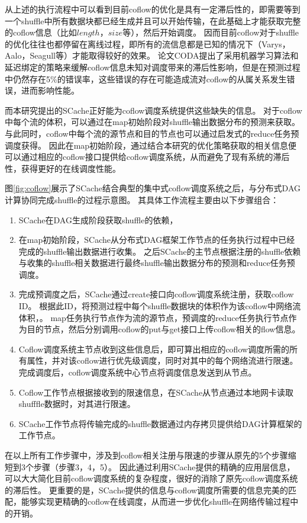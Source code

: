 从上述的执行流程中可以看到目前coflow的优化是具有一定滞后性的，即需要等到一个shuffle中所有数据块都已经生成并且可以开始传输，在此基础上才能获取完整的coflow信息（比如$length$，$size$等），然后开始调度。
因而目前coflow对于shuffle的优化往往也都停留在离线过程，即所有的流信息都是已知的情况下（Varys\cite{varys}，Aalo\cite{aalo}，Seagull\cite{seagull}等）才能取得较好的效果。
论文CODA\cite{coda}提出了采用机器学习算法和延迟绑定的策略来缓解coflow信息未知对调度带来的滞后性影响，但是在预测过程中仍然存在5\%的错误率，这些错误的存在可能造成流对coflow的从属关系发生错误，进而影响性能。

而本研究提出的SCache正好能为coflow调度系统提供这些缺失的信息。
对于coflow中每个流的体积，可以通过在map初始阶段对shuffle输出数据分布的预测来获取。
与此同时，coflow中每个流的源节点和目的节点也可以通过启发式的reduce任务预调度获得。
因此在map初始阶段，通过结合本研究的优化策略获取的相关信息便可以通过相应的coflow接口提供给coflow调度系统，从而避免了现有系统的滞后性，获得更好的在线调度性能。

图\ref{fig:coflow}展示了SCache结合典型的集中式coflow调度系统之后，与分布式DAG计算协同完成shuffle的过程示意图。
其具体工作流程主要由以下步骤组合：

\begin{enumerate}
	\item SCache在DAG生成阶段获取shuffle的依赖，
	\item 在map初始阶段，SCache从分布式DAG框架工作节点的任务执行过程中已经完成的shuffle输出数据进行收集。
	之后SCache的主节点根据注册的shuffle依赖与收集的shuffle相关数据进行最终shuffle输出数据分布的预测和reduce任务预调度。
	\item 完成预调度之后，SCache通过create接口向coflow调度系统注册，获取coflow ID。
	根据此ID，将预测过程中每个shuffle数据块的体积作为该coflow中网络流体积，。
	map任务执行节点作为流的源节点，预调度的reduce任务执行节点作为目的节点，然后分别调用coflow的put与get接口上传coflow相关的flow信息。
	\item Coflow调度系统主节点收到这些信息后，即可算出相应的coflow调度所需的所有属性，并对该coflow进行优先级调度，同时对其中的每个网络流进行限速。完成调度后，coflow调度系统中心节点将调度信息发送到从节点。
	\item Coflow工作节点根据接收到的限速信息，在SCache从节点通过本地网卡读取shufffle数据时，对其进行限速。
	\item SCache工作节点将传输完成的shuffle数据通过内存拷贝提供给DAG计算框架的工作节点。
\end{enumerate}

在以上所有工作步骤中，涉及到coflow相关注册与限速的步骤从原先的5个步骤缩短到3个步骤（步骤3，4，5）。
因此通过利用SCache提供的精确的应用层信息，可以大大简化目前coflow调度系统的复杂程度，很好的消除了原先coflow调度系统的滞后性。
更重要的是，SCache提供的信息与coflow调度所需要的信息完美的匹配，能够实现更精确的coflow在线调度，从而进一步优化shuffle在网络传输过程中的开销。

